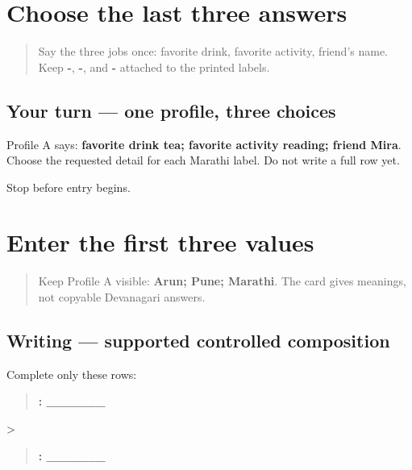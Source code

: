 \section[\mr{आवडते} \mr{पेय} · \mr{आवडती} \mr{कृती} · \mr{मित्राचे} \mr{नाव}]{Choose the last three answers}

\label{lesson:MR-A1F05-last-three-select}



\begin{quote}
Say the three jobs once: favorite drink, favorite activity, friend's name. Keep \textbf{-}, \textbf{-}, and \textbf{-} attached to the printed labels.
\end{quote}

\subsection*{Your turn — one profile, three choices}
Profile A says: \textbf{favorite drink tea; favorite activity reading; friend Mira}. Choose the requested detail for each Marathi label. Do not write a full row yet.

\begin{tcolorbox}[breakable,colback=teal!4,colframe=teal!35!black,title={Before you move on}]
Stop before entry begins.
\end{tcolorbox}
\section[\mr{नाव}: \_\_\_ · \mr{शहर}: \_\_\_ · \mr{भाषा}: \_\_\_]{Enter the first three values}

\label{lesson:MR-A1F06-first-three-supported}



\begin{quote}
Keep Profile A visible: \textbf{Arun; Pune; Marathi}. The card gives meanings, not copyable Devanagari answers.
\end{quote}

\subsection*{Writing — supported controlled composition}
Complete only these rows:

\begin{quote}
\textbf{: \_\_\_\_\_\_}
\end{quote}

>

\begin{quote}
\textbf{: \_\_\_\_\_\_}
\end{quote}

